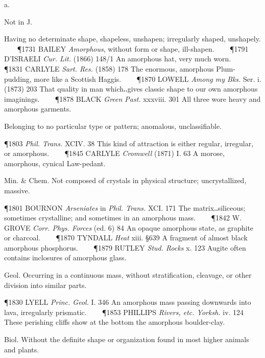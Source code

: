 \begin{description}[wide, labelwidth=!, labelindent=0pt]
  a.

\noindent  {}


Not in J. 
\begin{myenumerate}

 Having no determinate shape, shapeless, unshapen; irregularly shaped, unshapely. 
   
\P 1731 BAILEY \textit{Amorphous}, without form or shape, ill-shapen.    
\P 1791 D'ISRAELI \textit{Cur. Lit.} (1866) 148/1 An amorphous hat, very much worn.    
\P 1831 CARLYLE \textit{Sart. Res.} (1858) 178 The enormous, amorphous Plum-pudding, more like a Scottish Haggis.    
\P 1870 LOWELL \textit{Among my Bks.} Ser. i. (1873) 203 That quality in man which‥gives classic shape to our own amorphous imaginings.    
\P 1878 BLACK \textit{Green Past.} xxxviii. 301 All three wore heavy and amorphous garments.

 Belonging to no particular type or pattern; anomalous, unclassifiable. 

\P 1803 \textit{Phil. Trans.} XCIV. 38 This kind of attraction is either regular, irregular, or amorphous.    
\P 1845 CARLYLE \textit{Cromwell} (1871) I. 63 A morose, amorphous, cynical Law-pedant.

 Min. \& Chem. Not composed of crystals in physical structure; uncrystallized, massive. 

\P 1801 BOURNON \textit{Arseniates} in \textit{Phil. Trans.} XCI. 171 The matrix‥siliceous; sometimes crystalline; and sometimes in an amorphous mass.    
\P 1842 W. GROVE \textit{Corr. Phys. Forces} (ed. 6) 84 An opaque amorphous state, as graphite or charcoal.    
\P 1870 TYNDALL \textit{Heat} xiii. §639 A fragment of almost black amorphous phosphorus.    
\P 1879 RUTLEY \textit{Stud. Rocks} x. 123 Augite often contains inclosures of amorphous glass.

 Geol. Occurring in a continuous mass, without stratification, cleavage, or other division into similar parts. 

\P 1830 LYELL \textit{Princ. Geol.} I. 346 An amorphous mass passing downwards into lava, irregularly prismatic.    
\P 1853 PHILLIPS \textit{Rivers, etc. Yorksh.} iv. 124 These perishing cliffs show at the bottom the amorphous boulder-clay.

 Biol. Without the definite shape or organization found in most higher animals and plants. 


\end{myenumerate}
\end{description}
